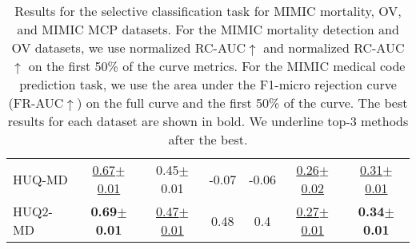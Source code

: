 \begin{table*}[!ht]
{\begin{tabular}{l|c|c|c|c|c|c}
HUQ-MD & \underline{0.67$\pm$0.01} & 0.45$\pm$0.01 & -0.07 & -0.06 & \underline{0.26$\pm$0.02} & \underline{0.31$\pm$0.01} \\
HUQ2-MD & \textbf{0.69$\pm$0.01} & \underline{0.47$\pm$0.01} & 0.48 & 0.4 & \underline{0.27$\pm$0.01} & \textbf{0.34$\pm$0.01} \\
\bottomrule
\end{tabular}
}\caption{\label{tab:mimic} Results for the selective classification task for MIMIC mortality, OV, and MIMIC MCP  datasets. For the MIMIC mortality detection and OV datasets, we use normalized RC-AUC$\uparrow$ and normalized RC-AUC$\uparrow$ on the first 50\% of the curve metrics. For the MIMIC medical code prediction task, we use the area under the F1-micro rejection curve (FR-AUC$\uparrow$) on the full curve and the first 50\% of the curve. The best results for each dataset are shown in bold. We underline top-3 methods after the best.}
\end{table*}